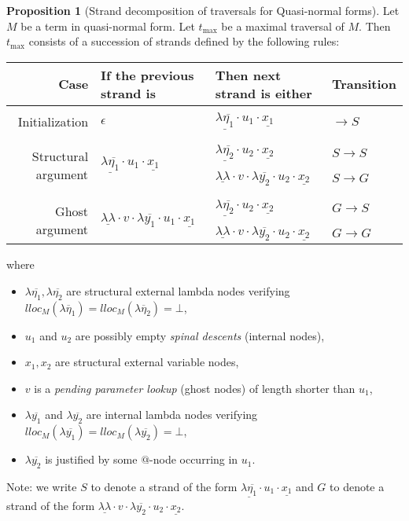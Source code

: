 \documentclass{article}
\theoremstyle{definition}
\newtheorem{proposition}{Proposition}[section]
\newcommand{\ghostlmd}{{\lambda\!\!\lambda}}
\begin{document}
\begin{proposition}[Strand decomposition of traversals for Quasi-normal forms]
\label{prop:qnf_strand_decomposition}
Let $M$ be a term in quasi-normal form. Let $t_{\max}$ be a maximal traversal of $M$. Then $t_{\max}$ consists of a succession of strands defined by the following rules:
\begin{center}
\begin{tabular}{rlll}
Case & If the previous strand is & Then next strand is either & Transition \\
\hline \hline \\
Initialization & $\epsilon$ & $\underline{\lambda\overline{\eta_1}} \cdot u_1 \cdot \underline{x_1}$ & $\rightarrow S$\\ \\
\hline \\
\multirow{3}{*}{Structural argument} & \multirow{3}{*}{$\underline{\lambda\overline{\eta_1}} \cdot u_1 \cdot \underline{x_1} $}
 & $\underline{\lambda\overline{\eta_2}} \cdot u_2 \cdot \underline{x_2}$ & $S \rightarrow S$ \\ \\
 & & $\underline{\ghostlmd} \cdot  v \cdot \lambda\overline{y_2} \cdot u_2 \cdot \underline{x_2}$ & $S \rightarrow G$ \\ \\
\hline \\
\multirow{3}{*}{Ghost argument} & \multirow{3}{*}{$\underline{\ghostlmd} \cdot  v \cdot \lambda\overline{y_1} \cdot u_1 \cdot \underline{x_1}$}
& $\underline{\lambda\overline{\eta_2}} \cdot u_2 \cdot \underline{x_2}$ & $G \rightarrow S$
\\ \\
  & & $\underline{\ghostlmd} \cdot v \cdot \lambda\overline{y_2} \cdot u_2 \cdot \underline{x_2}$ & $G \rightarrow G$
\end{tabular}
\end{center}
where
    \begin{itemize}
    \item $\lambda\overline{\eta_1}, \lambda\overline{\eta_2}$ are structural external lambda nodes verifying $lloc_M(\lambda\overline\eta_1) = lloc_M(\lambda\overline\eta_2) = \bot$,
    \item $u_1$ and $u_2$ are possibly empty \emph{spinal descents} (internal nodes),
    \item $x_1,x_2$ are structural external variable nodes,
    \item $v$ is a \emph{pending parameter lookup} (ghost nodes) of length shorter than $u_1$,
    \item $\lambda\overline{y_1}$ and $\lambda\overline{y_2}$ are internal lambda nodes verifying $lloc_M(\lambda\overline{y_1}) = lloc_M(\lambda\overline{y_2}) = \bot$,
    \item $\lambda\overline{y_2}$ is justified by some $@$-node occurring in $u_1$.
    \end{itemize}
Note: we write $S$ to denote a strand of the form $\underline{\lambda\overline{\eta_1}} \cdot u_1 \cdot \underline{x_1}$
and $G$ to denote a strand of the form $\underline{\ghostlmd} \cdot  v \cdot \lambda\overline{y_2} \cdot u_2 \cdot \underline{x_2}$.
\end{proposition}
\end{document}
